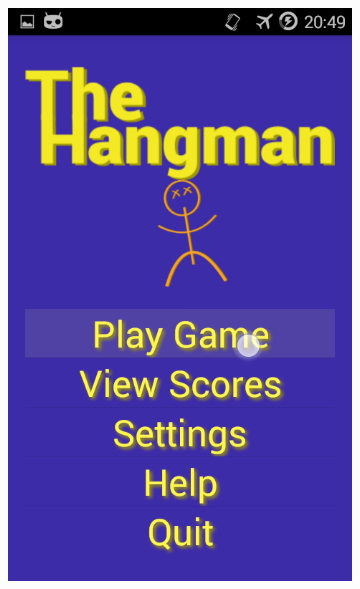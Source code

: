 \begin{enumerate}
\begin{figure}[ht]
    \centering
   \begin{subfigure}[b]{0.25\textwidth}
        \includegraphics[width=\textwidth]{./img/design/d1.png}
    \end{subfigure}
    \begin{subfigure}[b]{0.25\textwidth}

\end{subfigure}
\end{figure}
\end{enumerate}
